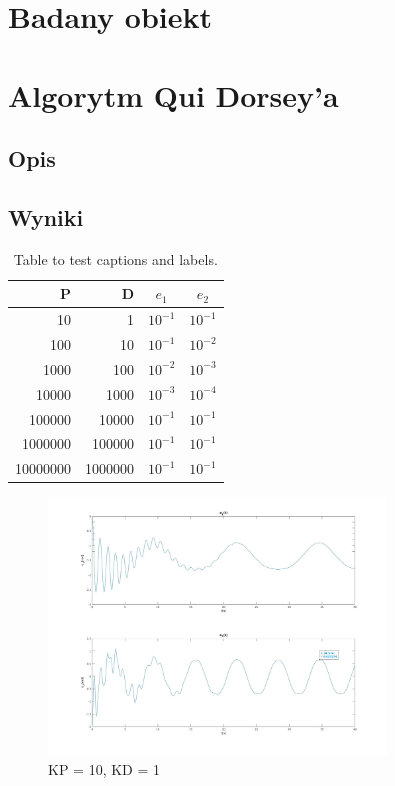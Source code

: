 \documentclass[12pt,a4paper]{article}
\begin{document}
\pdfpageheight   297mm
\pdfpagewidth    210mm

\StronaTytulowa
\SpisTresci

\pagebreak

\section{Badany obiekt}

\section{Algorytm Qui Dorsey'a}
  \subsection{Opis} %
  \subsection{Wyniki} %

  \begin{table}[h!]
    \centering
    \begin{tabular}{ r | r | c | c }
      P & D & $e_1$ & $e_2$  \\ 
      \hline
      10 & 1 & $10^{-1}$ & $10^{-1}$ \\  
      100 & 10 & $10^{-1}$ & $10^{-2}$ \\  
      1000 & 100 & $10^{-2}$ & $10^{-3}$ \\  
      10000 & 1000 & $10^{-3}$ & $10^{-4}$ \\  
      100000 & 10000 & $10^{-1}$ & $10^{-1}$ \\  
      1000000 & 100000 & $10^{-1}$ & $10^{-1}$ \\  
      10000000 & 1000000 & $10^{-1}$ & $10^{-1}$  
    \end{tabular}
    \caption{Table to test captions and labels.}
    \label{table:1}
  \end{table}

  \begin{figure}[ht]
    \centering
    \includegraphics[width=0.8\textwidth]{figures/qui10.jpg}
    \caption{KP = 10, KD = 1}
  \end{figure}
\end{document}
